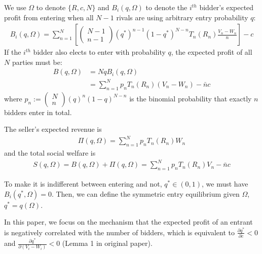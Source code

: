 \documentclass[11pt]{elegantbook}
\begin{document}
We use $\Omega$ to denote $\{R,c,N\}$ and $B_i(q,\Omega)$ to denote the $i^{th}$ bidder's expected profit from entering when all $N-1$ rivals are using arbitrary entry probability $q$:
\begin{equation}
    \begin{aligned}
        B_i(q,\Omega)=\sum_{n=1}^N\left[
            \begin{pmatrix}
            N-1\\
            n-1
        \end{pmatrix}
        (q^*)^{n-1}(1-q^*)^{N-n}T_n(R_n)\frac{V_n-W_n}{n}
        \right]-c
    \end{aligned}
    \nonumber
\end{equation}
If the $i^{th}$ bidder also elects to enter with probability $q$, the expected profit of all $N$ parties must be:
\begin{equation}
    \begin{aligned}
        B(q,\Omega)&=NqB_i(q,\Omega)\\
        &=\sum_{n=1}^N p_n T_n(R_n)(V_n-W_n)-\bar{n}c
    \end{aligned}
    \nonumber
\end{equation}
where $p_n:=\begin{pmatrix}N\\n\end{pmatrix}(q)^{n}(1-q)^{N-n}$ is the binomial probability that exactly $n$ bidders enter in total.

The seller's expected revenue is
\begin{equation}
    \begin{aligned}
        \Pi(q,\Omega)=\sum_{n=1}^N p_n T_n(R_n)W_n
    \end{aligned}
    \nonumber
\end{equation}
and the total social welfare is
\begin{equation}
    \begin{aligned}
        S(q,\Omega)=B(q,\Omega)+\Pi(q,\Omega)=\sum_{n=1}^N p_n T_n(R_n)V_n-\bar{n}c
    \end{aligned}
    \nonumber
\end{equation}

To make it is indifferent between entering and not, $q^*\in (0,1)$, we must have $B_i(q^*,\Omega)=0$. Then, we can define the symmetric entry equilibrium given $\Omega$, $q^*=q(\Omega)$.
\begin{assumption}
    In this paper, we focus on the mechanism that the expected profit of an entrant is negatively correlated with the number of bidders, which is equivalent to $\frac{\partial q^*}{\partial c}<0$ and $\frac{\partial q^*}{\partial (V_i-W_i)}<0$ (Lemma 1 in original paper).
\end{assumption}
\end{document}
